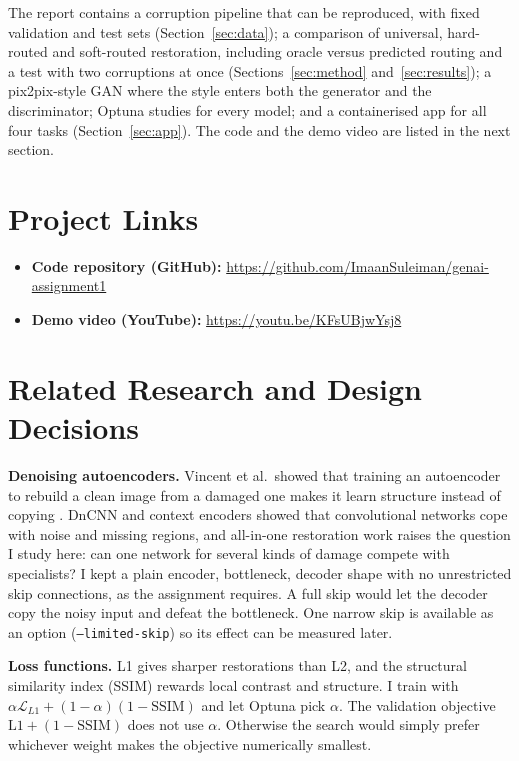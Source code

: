 \documentclass[journal,onecolumn,12pt,a4paper]{IEEEtran}
\let\oldsection\section
\renewcommand{\section}[1]{\oldsection{\textbf{#1}}}
\begin{document}
The report contains a corruption pipeline that can be reproduced, with fixed validation and test sets (Section~\ref{sec:data}); a comparison of universal, hard-routed and soft-routed restoration, including oracle versus predicted routing and a test with two corruptions at once (Sections~\ref{sec:method} and~\ref{sec:results}); a pix2pix-style GAN where the style enters both the generator and the discriminator; Optuna studies for every model; and a containerised app for all four tasks (Section~\ref{sec:app}). The code and the demo video are listed in the next section.

\section{Project Links}
\begin{itemize}
\item \textbf{Code repository (GitHub):} \url{https://github.com/ImaanSuleiman/genai-assignment1}
\item \textbf{Demo video (YouTube):} \url{https://youtu.be/KFsUBjwYsj8}
\end{itemize}

\section{Related Research and Design Decisions}\label{sec:related}
\textbf{Denoising autoencoders.} Vincent et al.\ showed that training an autoencoder to rebuild a clean image from a damaged one makes it learn structure instead of copying \cite{vincent2008}. DnCNN \cite{zhang2017dncnn} and context encoders \cite{pathak2016} showed that convolutional networks cope with noise and missing regions, and all-in-one restoration work \cite{li2022airnet} raises the question I study here: can one network for several kinds of damage compete with specialists? I kept a plain encoder, bottleneck, decoder shape with no unrestricted skip connections, as the assignment requires. A full skip would let the decoder copy the noisy input and defeat the bottleneck. One narrow skip is available as an option (\texttt{--limited-skip}) so its effect can be measured later.

\textbf{Loss functions.} L1 gives sharper restorations than L2, and the structural similarity index (SSIM) \cite{wang2004ssim} rewards local contrast and structure. I train with $\alpha\mathcal{L}_{L1}+(1-\alpha)(1-\mathrm{SSIM})$ and let Optuna pick $\alpha$. The validation objective $\mathrm{L1}+(1-\mathrm{SSIM})$ does not use $\alpha$. Otherwise the search would simply prefer whichever weight makes the objective numerically smallest.
\end{document}
